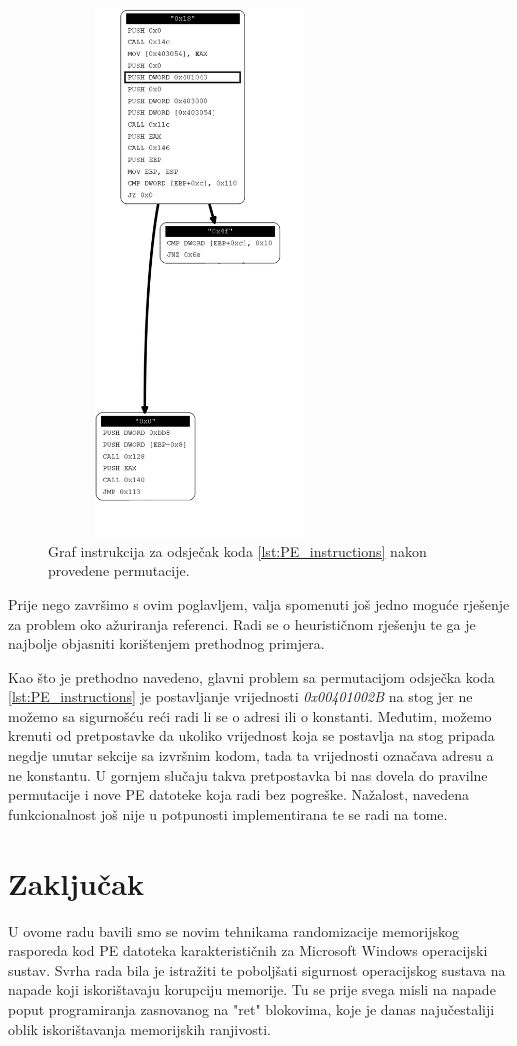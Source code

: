 \documentclass[times, utf8, diplomski, numeric]{fer}
\begin{document}
\begin{figure}[!htb]
\centering
\setlength\fboxsep{0pt}
\setlength\fboxrule{0.5pt}
\includegraphics[width=8cm, height=14cm]{slike/permutator_graph_permutated}
\caption{Graf instrukcija za odsječak koda \ref{lst:PE_instructions} nakon provedene permutacije.}
\label{fig:control_flow_graph_permutated} 
\end{figure}
Prije nego završimo s ovim poglavljem, valja spomenuti još jedno moguće rješenje za problem oko ažuriranja referenci. Radi se o heurističnom rješenju te ga je najbolje objasniti korištenjem prethodnog primjera.

Kao što je prethodno navedeno, glavni problem sa permutacijom odsječka koda \ref{lst:PE_instructions} je postavljanje vrijednosti \emph{0x00401002B} na stog jer ne možemo sa sigurnošću reći radi li se o adresi ili o konstanti. Međutim, možemo krenuti od pretpostavke da ukoliko vrijednost koja se postavlja na stog pripada negdje unutar sekcije sa izvršnim kodom, tada ta vrijednosti označava adresu a ne konstantu. U gornjem slučaju takva pretpostavka bi nas dovela do pravilne permutacije i nove PE datoteke koja radi bez pogreške. Nažalost, navedena funkcionalnost još nije u potpunosti implementirana te se radi na tome.

\chapter{Zaključak}
U ovome radu bavili smo se novim tehnikama randomizacije memorijskog rasporeda kod PE datoteka karakterističnih za  Microsoft Windows operacijski sustav. Svrha rada bila je istražiti te poboljšati sigurnost operacijskog sustava na napade koji iskorištavaju korupciju memorije. Tu se prije svega misli na napade poput programiranja zasnovanog na "ret" blokovima, koje je danas najučestaliji oblik iskorištavanja memorijskih ranjivosti.
\end{document}
